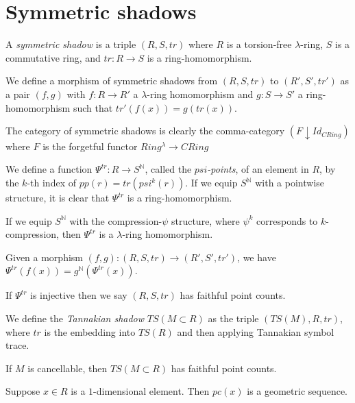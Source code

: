 
\section{Symmetric shadows}

\begin{definition}
  A \emph{symmetric shadow} is a triple $(R, S, tr)$ where $R$ is a torsion-free $\lambda$-ring, $S$ is a commutative ring, and $tr: R \to S$ is a ring-homomorphism.  
\end{definition}

\begin{definition}
  We define a morphism of symmetric shadows from $(R, S, tr)$ to $(R', S', tr')$ as a pair $(f, g)$ with $f : R \to R'$ a $\lambda$-ring homomorphism and $g : S \to S'$ a ring-homomorphism such that $tr'(f(x)) = g(tr(x))$.
\end{definition}

\begin{remark}
  The category of symmetric shadows is clearly the comma-category $(F \downarrow Id_{CRing})$ where $F$ is the forgetful functor $Ring^{\lambda} \to CRing$
\end{remark}

\begin{definition}
  We define a function $\Psi^{tr} : R \to S^{\mathbb{N}}$, called the \emph{$psi$-points}, of an element in $R$, by the $k$-th index of $pp(r) = tr(psi^k(r))$. If we equip $S^{\mathbb{N}}$ with a pointwise structure, it is clear that $\Psi^{tr}$ is a ring-homomorphism. 
\end{definition}

\begin{proposition}
  If we equip $S^{\mathbb{N}}$ with the compression-$\psi$ structure, where $\psi^k$ corresponds to $k$-compression, then $\Psi^{tr}$ is a $\lambda$-ring homomorphism.
\end{proposition}

\begin{proposition}
  Given a morphism $(f, g) : (R, S, tr) \to (R', S', tr')$, we have $\Psi^{tr}(f(x)) = g^{\mathbb{N}}(\Psi^{tr}(x))$.
\end{proposition}

\begin{definition}
  If $\Psi^{tr}$ is injective then we say $(R, S, tr)$ has faithful point counts. 
\end{definition}

\begin{definition}
  We define the \emph{Tannakian shadow} $TS(M \subset R)$ as the triple $(TS(M), R, tr)$, where $tr$ is the embedding into $TS(R)$ and then applying Tannakian symbol trace. 
\end{definition}

\begin{proposition}
  If $M$ is cancellable, then $TS(M \subset R)$ has faithful point counts. 
\end{proposition}


\begin{proposition}
  Suppose $x \in R$ is a $1$-dimensional element. Then $pc(x)$ is a geometric sequence.
\end{proposition}
